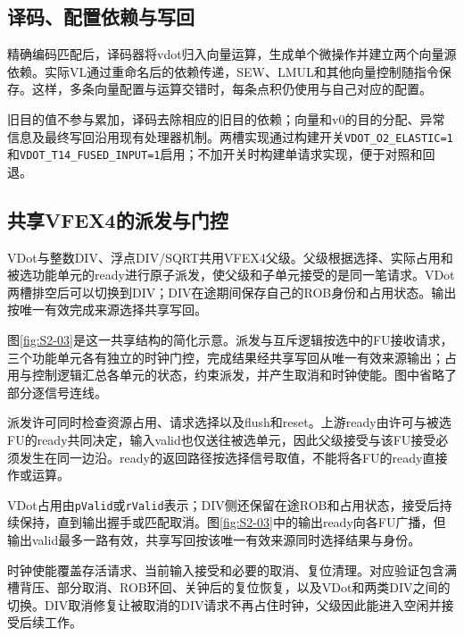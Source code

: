 \subsection{译码、配置依赖与写回}
精确编码匹配后，译码器将vdot归入向量运算，生成单个微操作并建立两个向量源依赖。实际VL通过重命名后的依赖传递，SEW、LMUL和其他向量控制随指令保存。这样，多条向量配置与运算交错时，每条点积仍使用与自己对应的配置。

旧目的值不参与累加，译码去除相应的旧目的依赖；向量和v0的目的分配、异常信息及最终写回沿用现有处理器机制。两槽实现通过构建开关\texttt{VDOT\_O2\_ELASTIC=1}和\texttt{VDOT\_T14\_FUSED\_INPUT=1}启用；不加开关时构建单请求实现，便于对照和回退。

\subsection{共享VFEX4的派发与门控}\label{subsec:2-vfex4}
VDot与整数DIV、浮点DIV/SQRT共用VFEX4父级。父级根据选择、实际占用和被选功能单元的ready进行原子派发，使父级和子单元接受的是同一笔请求。VDot两槽排空后可以切换到DIV；DIV在途期间保存自己的ROB身份和占用状态。输出按唯一有效完成来源选择共享写回。

图\ref{fig:S2-03}是这一共享结构的简化示意。派发与互斥逻辑按选中的FU接收请求，三个功能单元各有独立的时钟门控，完成结果经共享写回从唯一有效来源输出；占用与控制逻辑汇总各单元的状态，约束派发，并产生取消和时钟使能。图中省略了部分逐信号连线。


派发许可同时检查资源占用、请求选择以及flush和reset。上游ready由许可与被选FU的ready共同决定，输入valid也仅送往被选单元，因此父级接受与该FU接受必须发生在同一边沿。ready的返回路径按选择信号取值，不能将各FU的ready直接作或运算。

VDot占用由\texttt{pValid}或\texttt{rValid}表示；DIV侧还保留在途ROB和占用状态，接受后持续保持，直到输出握手或匹配取消。图\ref{fig:S2-03}中的输出ready向各FU广播，但输出valid最多一路有效，共享写回按该唯一有效来源同时选择结果与身份。

时钟使能覆盖存活请求、当前输入接受和必要的取消、复位清理。对应验证包含满槽背压、部分取消、ROB环回、关钟后的复位恢复，以及VDot和两类DIV之间的切换。DIV取消修复让被取消的DIV请求不再占住时钟，父级因此能进入空闲并接受后续工作。

